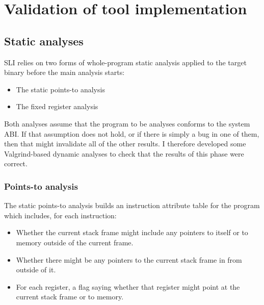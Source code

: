 \section{Validation of tool implementation}
\label{sect:eval:validation}

\subsection{Static analyses}

SLI relies on two forms of whole-program static analysis applied to
the target binary before the main analysis starts:

\begin{itemize}
\item
  The static points-to analysis
\item
  The fixed register analysis
\end{itemize}

Both analyses assume that the program to be analyses conforms to the
system ABI.  If that assumption does not hold, or if there is simply a
bug in one of them, then that might invalidate all of the other
results.  I therefore developed some Valgrind-based dynamic analyses
to check that the results of this phase were correct.


\subsubsection{Points-to analysis}
\label{sect:eval:validate:pta}

The static points-to analysis builds an instruction attribute table
for the program which includes, for each instruction:

\begin{itemize}
\item
  Whether the current stack frame might include any pointers to itself
  or to memory outside of the current frame.
\item
  Whether there might be any pointers to the current stack frame in
  from outside of it.
\item
  For each register, a flag saying whether that register might point
  at the current stack frame or to memory.
\end{itemize}

